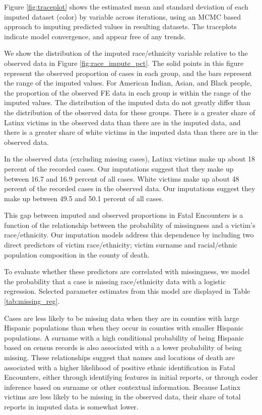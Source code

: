 \documentclass{article}
\begin{document}
Figure \ref{fig:traceplot} shows the estimated mean and standard deviation of each imputed dataset (color) by variable across iterations, using an MCMC based approach to imputing predicted values in resulting datasets. The traceplots indicate model convergence, and appear free of any trends. 

We show the distribution of the imputed race/ethnicity variable relative to the observed data in Figure \ref{fig:race_impute_pct}. The solid points in this figure represent the observed proportion of cases in each group, and the bars represent the range of the imputed values. For American Indian, Asian, and Black people, the proportion of the observed FE data in each group is within the range of the imputed values. The distribution of the imputed data do not greatly differ than the distribution of the observed data for these groups. There is a greater share of Latinx victims in the observed data than there are in the imputed data, and there is a greater share of white victims in the imputed data than there are in the observed data. 

In the observed data (excluding missing cases), Latinx victims make up about 18 percent of the recorded cases. Our imputations suggest that they make up between 16.7 and 16.9 percent of all cases. White victims make up about 48 percent of the recorded cases in the observed data. Our imputations suggest they make up between 49.5 and 50.1 percent of all cases. 

This gap between imputed and observed proportions in Fatal Encounters is a function of the relationship between the probability of missingness and a victim's race/ethnicity. Our imputation models address this dependence by including two direct predictors of victim race/ethnicity; victim surname and racial/ethnic population composition in the county of death. 

To evaluate whether these predictors are correlated with missingness, we model the probability that a case is missing race/ethnicity data with a logistic regression. Selected parameter estimates from this model are displayed in Table \ref{tab:missing_reg}. 



Cases are less likely to be missing data when they are in counties with large Hispanic populations than when they occur in counties with smaller Hispanic populations. A surname with a high conditional probability of being Hispanic based on census records is also associated with a a lower probability of being missing. These relationships suggest that names and locations of death are associated with a higher likelihood of positive ethnic identification in Fatal Encounters, either through identifying features in initial reports, or through coder inference based on surname or other contextual information. Because Latinx victims are less likely to be missing in the observed data, their share of total reports in imputed data is somewhat lower.
\end{document}
